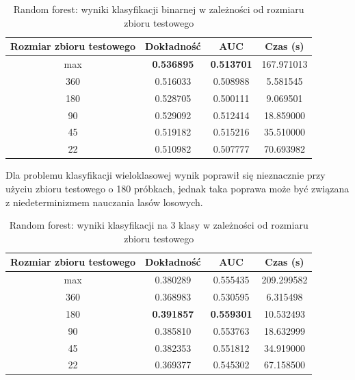 \documentclass[a4paper, twoside, 11pt, openright]{article}
\begin{document}
\begin{table}[H]
    \centering
    \begin{tabular}{|c|c|c|c|}
    \hline
        \textbf{Rozmiar zbioru testowego} & \textbf{Dokładność} & \textbf{AUC} & \textbf{Czas (s)} \\ \hline
max                         & \textbf{0.536895} &  \textbf{0.513701} &  167.971013 \\ \hline
360                         &  0.516033 &  0.508988 &    5.581545 \\ \hline
180                         &  0.528705 &  0.500111 &    9.069501 \\ \hline
90                          &  0.529092 &  0.512414 &   18.859000 \\ \hline
45                          &  0.519182 &  0.515216 &   35.510000 \\ \hline
22                          &  0.510982 &  0.507777 &   70.693982 \\ \hline

    \end{tabular}
    \caption{Random forest: wyniki klasyfikacji binarnej w zależności od rozmiaru zbioru testowego}
    \label{tab:rf_walk_forward_binary}
\end{table}

Dla problemu klasyfikacji wieloklasowej wynik poprawił się nieznacznie przy użyciu zbioru testowego o 180 próbkach, jednak taka poprawa może być związana z  niedeterminizmem nauczania lasów losowych.

\begin{table}[H]
    \centering
    \begin{tabular}{|c|c|c|c|}
    \hline
        \textbf{Rozmiar zbioru testowego} & \textbf{Dokładność} & \textbf{AUC} & \textbf{Czas (s)} \\ \hline
max                         &   0.380289 &  0.555435 &  209.299582 \\ \hline
360                         &  0.368983 &  0.530595 &    6.315498 \\ \hline
180                         &  \textbf{0.391857} &  \textbf{0.559301} &   10.532493 \\ \hline
90                          &  0.385810 &  0.553763 &   18.632999 \\ \hline
45                          &  0.382353 &  0.551812 &   34.919000 \\ \hline
22                          &  0.369377 &  0.545302 &   67.158500 \\ \hline
    \end{tabular}
    \caption{Random forest: wyniki klasyfikacji na 3 klasy w zależności od rozmiaru zbioru testowego}
    \label{tab:rf_walk_forward_discrete}
\end{table}
\end{document}
